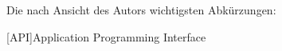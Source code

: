 \chapter*{\nameofacronymstable}
Die nach Ansicht des Autors wichtigsten Abkürzungen:
\bigskip

\begin{adjustwidth}{1.5em}{}
\begin{acronym}[API] %
	
	[API]{Application Programming Interface}
	
\end{acronym}	
\end{adjustwidth}
